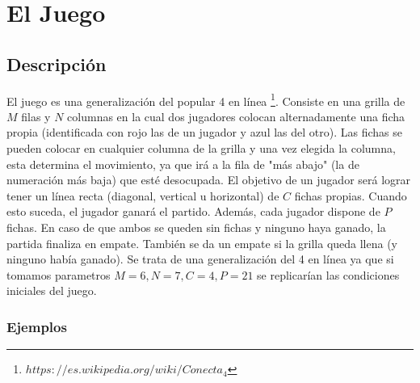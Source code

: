 \documentclass[A4paper,oneside,fleqn,11pt]{article}
\theoremstyle{definition}
\begin{document}
 



\tableofcontents
\clearpage







\section{El Juego}
\subsection{Descripción}
El juego es una generalización del popular 4 en línea \footnote{$https://es.wikipedia.org/wiki/Conecta_4$}. Consiste en una grilla de $M$ filas y $N$ columnas en la cual dos jugadores colocan alternadamente una ficha propia (identificada con rojo las de un jugador y azul las del otro). Las fichas se pueden colocar en cualquier columna de la grilla y una vez elegida la columna, esta determina el movimiento, ya que irá a la fila de "más abajo" (la de numeración más baja) que esté desocupada. El objetivo de un jugador será lograr tener un línea recta (diagonal, vertical u horizontal) de $C$ fichas propias. Cuando esto suceda, el jugador ganará el partido. Además, cada jugador dispone de $P$ fichas. En caso de que ambos se queden sin fichas y ninguno haya ganado, la partida finaliza en empate. También se da un empate si la grilla queda llena (y ninguno había ganado). Se trata de una generalización del 4 en línea ya que si tomamos parametros $M=6, N=7, C=4, P=21$ se replicarían las condiciones iniciales del juego.
\subsubsection{Ejemplos}
\end{document}

